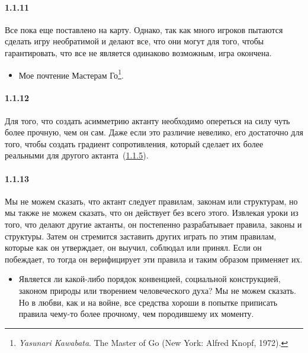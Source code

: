 \paragraph{1.1.11}\hypertarget{par:1.1.11}{} Все пока еще поставлено на карту. Однако, так как много игроков пытаются сделать игру необратимой и делают все, что они могут для того, чтобы гарантировать, что все не является одинаково возможным, игра окончена.
	\begin{itemize}
	\item Мое почтение Мастерам Го\footnote{{\itshape Yasunari Kawabata}. The Master of Go (New York: Alfred Knopf, 1972).}.
	\end{itemize}

\paragraph{1.1.12}\hypertarget{par:1.1.12}{} Для того, что создать асимметрию актанту необходимо опереться на силу чуть более прочную, чем он сам. Даже если это различие невелико, его достаточно для того, чтобы создать градиент сопротивления, который сделает их более реальными
для другого актанта~(\hyperlink{par:1.1.5}{1.1.5}).

\paragraph{1.1.13}\hypertarget{par:1.1.13}{} Мы не можем сказать, что актант следует правилам, законам или структурам, но мы также не можем сказать, что он действует без всего этого. Извлекая уроки из того, что делают другие актанты, он постепенно разрабатывает правила, законы и структуры. Затем он стремится заставить других играть по этим правилам, которые
как он утверждает, он выучил, соблюдал или принял. Если он побеждает, то тогда он верифицирует эти правила и таким образом применяет их. 
	\begin{itemize}
	\item Является ли какой-либо порядок конвенцией, социальной конструкцией, законом природы или творением человеческого духа? Мы не можем сказать. Но в любви, как и на войне, все средства хороши в попытке приписать правила чему-то более прочному, чем породившему их моменту.

	\end{itemize}

